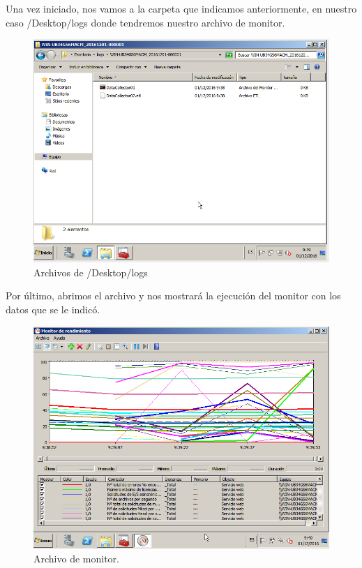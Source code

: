 Una vez iniciado, nos vamos a la carpeta que indicamos anteriormente, en nuestro caso /Desktop/logs donde tendremos nuestro archivo de monitor.

\begin{figure}[H] %
	\centering
	\includegraphics[scale=0.5]{imagenes/CD-9.png}  %
	\caption{Archivos de /Desktop/logs}
\end{figure}

Por último, abrimos el archivo y nos mostrará la ejecución del monitor con los datos que se le indicó.

\begin{figure}[H] %
	\centering
	\includegraphics[scale=0.5]{imagenes/CD-10.png}  %
	\caption{Archivo de monitor.}
\end{figure}

